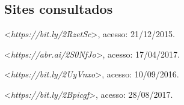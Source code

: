 \subsection{Sites consultados}

\begin{Parskip}
\textless{}\emph{https://bit.ly/2RzetSc}\textgreater{}, acesso: 21/12/2015.

\textless{}\emph{https://abr.ai/2S0NfJo}\textgreater{}, acesso: 17/04/2017.

\textless{}\emph{https://bit.ly/2UyVnxo}\textgreater{}, acesso: 10/09/2016.

\textless{}\emph{https://bit.ly/2Bpicgf}\textgreater{}, acesso: 28/08/2017.
\end{Parskip}